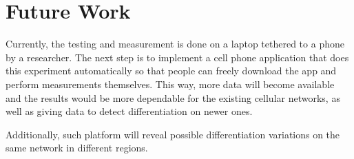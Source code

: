 \documentclass[letterpaper]{sig-alternate-10pt}
\begin{document}
\section{Future Work}

Currently, the testing and measurement is done on a laptop tethered to a phone by a researcher. The next step is to implement a cell phone application that does this experiment automatically so that people can freely download the app and perform measurements themselves. This way, more data will become available and the results would be more dependable for the existing cellular networks, as well as giving data to detect differentiation on newer ones.

Additionally, such platform will reveal possible differentiation variations on the same network in different regions.

\begin{small}

\end{small}
\end{document}
